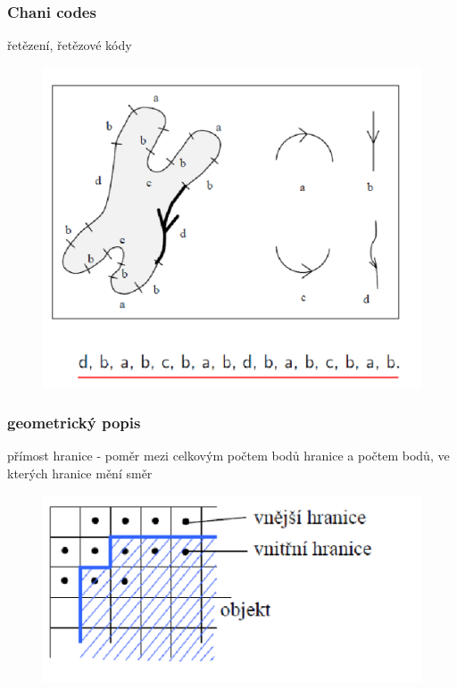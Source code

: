 \subsubsection*{Chani codes}
řetězení, řetězové kódy\\
\begin{figure}[H]
    \includegraphics[scale = 0.3]{images/chain_codes.png}
\end{figure}
\subsubsection*{geometrický popis}
přímost hranice - poměr mezi celkovým počtem bodů hranice a počtem bodů, ve kterých hranice mění směr\\
\begin{figure}[H]
    \includegraphics[scale = 0.2]{images/geometricky_popis.png}
\end{figure}
\newpage
